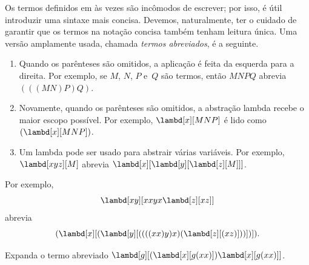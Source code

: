 \documentclass[../../../include/open-logic-section]{subfiles}
\begin{document}

Os termos definidos em  às vezes são incômodos de
escrever; por isso, é útil introduzir uma sintaxe mais concisa. Devemos,
naturalmente, ter o cuidado de garantir que os termos na notação concisa
também tenham leitura única. Uma versão amplamente usada, chamada
\emph{termos abreviados}, é a seguinte.

\begin{enumerate}
\item Quando os parênteses são omitidos, a aplicação é feita da esquerda
  para a direita. Por exemplo, se $M$, $N$, $P$ e~$Q$ são termos, então
  $MNPQ$ abrevia $(((MN)P)Q)$.
\item Novamente, quando os parênteses são omitidos, a abstração lambda recebe
  o maior escopo possível. Por exemplo, $\lambd[x][MNP]$ é lido como
  $(\lambd[x][MNP])$.
\item Um lambda pode ser usado para abstrair várias variáveis. Por exemplo,
  $\lambd[xyz][M]$ abrevia
  $\lambd[x][\lambd[y][\lambd[z][M]]]$.
\end{enumerate}

Por exemplo,
\[
\lambd[xy][xxyx \lambd[z][xz]]
\]
abrevia
\[
(\lambd[x][(\lambd[y][((((xx)y)x)(\lambd[z][(xz)]))])]).
\]

\begin{prob}
Expanda o termo abreviado $\lambd[g][(\lambd[x][g (x x)])
  \lambd[x][g (x x)]]$.
\end{prob}
\end{document}
